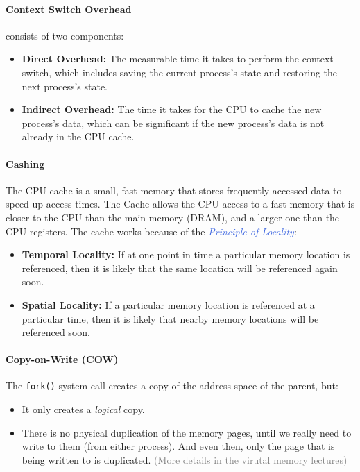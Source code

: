 \documentclass[openany,12pt]{book}
\newcommand{\code}[1]{\texttt{#1}}
\newcommand{\blue}[1]{\textcolor{RoyalBlue}{#1}}
\newcommand{\gray}[1]{\textcolor{gray}{#1}}
\begin{document}
\paragraph{Context Switch Overhead} consists of two components:
\begin{itemize}
  \item \textbf{Direct Overhead:} The measurable time it takes to perform the context switch, which includes saving the current process's state and restoring the next process's state.
  \item \textbf{Indirect Overhead:} The time it takes for the CPU to cache the new process's data, which can be significant if the new process's data is not already in the CPU cache.
\end{itemize}

\paragraph{Cashing} The CPU cache is a small, fast memory that stores frequently accessed data to speed up access times. The Cache allows the CPU access to a fast memory that is closer to the CPU than the main memory (DRAM), and a larger one than the CPU registers. The cache works because of the \blue{\textit{Principle of Locality}}:
\begin{itemize}
  \item \textbf{Temporal Locality:} If at one point in time a particular memory location is referenced, then it is likely that the same location will be referenced again soon.
  \item \textbf{Spatial Locality:} If a particular memory location is referenced at a particular time, then it is likely that nearby memory locations will be referenced soon.
\end{itemize}



\paragraph{Copy-on-Write (COW)} The \code{fork()} system call creates a copy of the address space of the parent, but:
\begin{itemize}
  \item It only creates a \textit{logical} copy.
  \item There is no physical duplication of the memory pages, until we really need to write to them (from either process). And even then, only the page that is being written to is duplicated. \gray{(More details in the virutal memory lectures)}
\end{itemize}
\end{document}
